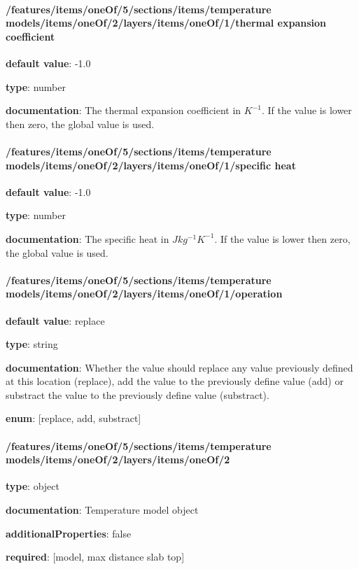 \begin{itemized}
\end{itemized}\paragraph{/features/items/oneOf/5/sections/items/temperature models/items/oneOf/2/layers/items/oneOf/1/thermal expansion coefficient} \begin{itemized}
\item {\bf default value}: -1.0
\item {\bf type}: number
\item {\bf documentation}: The thermal expansion coefficient in $K^{-1}$. If the value is lower then zero, the global value is used.
\end{itemized}\paragraph{/features/items/oneOf/5/sections/items/temperature models/items/oneOf/2/layers/items/oneOf/1/specific heat} \begin{itemized}
\item {\bf default value}: -1.0
\item {\bf type}: number
\item {\bf documentation}: The specific heat in $J kg^{-1} K^{-1}$. If the value is lower then zero, the global value is used.
\end{itemized}\paragraph{/features/items/oneOf/5/sections/items/temperature models/items/oneOf/2/layers/items/oneOf/1/operation} \begin{itemized}
\item {\bf default value}: replace
\item {\bf type}: string
\item {\bf documentation}: Whether the value should replace any value previously defined at this location (replace), add the value to the previously define value (add) or substract the value to the previously define value (substract).
\item {\bf enum}: [replace, add, substract]\end{itemized}\paragraph{/features/items/oneOf/5/sections/items/temperature models/items/oneOf/2/layers/items/oneOf/2} \begin{itemized}
\item {\bf type}: object
\item {\bf documentation}: Temperature model object
\item {\bf additionalProperties}: false
\item {\bf required}: [model, max distance slab top]\end{itemized}
